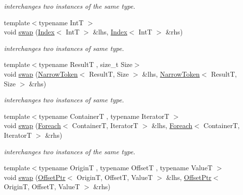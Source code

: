 \begin{DoxyCompactItemize}
\begin{DoxyCompactList}\small\item\em interchanges two instances of the same type. \end{DoxyCompactList}\item 
{\footnotesize template$<$typename Int\-T $>$ }\\void \hyperlink{namespacehryky_a805bdceb356edfcf8f183822a54421c0}{swap} (\hyperlink{classhryky_1_1_index}{Index}$<$ Int\-T $>$ \&lhs, \hyperlink{classhryky_1_1_index}{Index}$<$ Int\-T $>$ \&rhs)
\begin{DoxyCompactList}\small\item\em interchanges two instances of same type. \end{DoxyCompactList}\item 
{\footnotesize template$<$typename Result\-T , size\-\_\-t Size$>$ }\\void \hyperlink{namespacehryky_ae6f86b24f33103abda6e0c6a57406d9d}{swap} (\hyperlink{classhryky_1_1_narrow_token}{Narrow\-Token}$<$ Result\-T, Size $>$ \&lhs, \hyperlink{classhryky_1_1_narrow_token}{Narrow\-Token}$<$ Result\-T, Size $>$ \&rhs)
\begin{DoxyCompactList}\small\item\em interchanges two instances of same type. \end{DoxyCompactList}\item 
\hypertarget{namespacehryky_aa7ddc0b2566f433d6c53ad6e1b7291d0}{{\footnotesize template$<$typename Container\-T , typename Iterator\-T $>$ }\\void \hyperlink{namespacehryky_aa7ddc0b2566f433d6c53ad6e1b7291d0}{swap} (\hyperlink{classhryky_1_1_foreach}{Foreach}$<$ Container\-T, Iterator\-T $>$ \&lhs, \hyperlink{classhryky_1_1_foreach}{Foreach}$<$ Container\-T, Iterator\-T $>$ \&rhs)}\label{namespacehryky_aa7ddc0b2566f433d6c53ad6e1b7291d0}

\begin{DoxyCompactList}\small\item\em interchanges two instances of the same type. \end{DoxyCompactList}\item 
\hypertarget{namespacehryky_a5464e322c2478bcff1432a4fe63a8a59}{{\footnotesize template$<$typename Origin\-T , typename Offset\-T , typename Value\-T $>$ }\\void \hyperlink{namespacehryky_a5464e322c2478bcff1432a4fe63a8a59}{swap} (\hyperlink{classhryky_1_1_offset_ptr}{Offset\-Ptr}$<$ Origin\-T, Offset\-T, Value\-T $>$ \&lhs, \hyperlink{classhryky_1_1_offset_ptr}{Offset\-Ptr}$<$ Origin\-T, Offset\-T, Value\-T $>$ \&rhs)}\label{namespacehryky_a5464e322c2478bcff1432a4fe63a8a59}


\end{DoxyCompactItemize}
